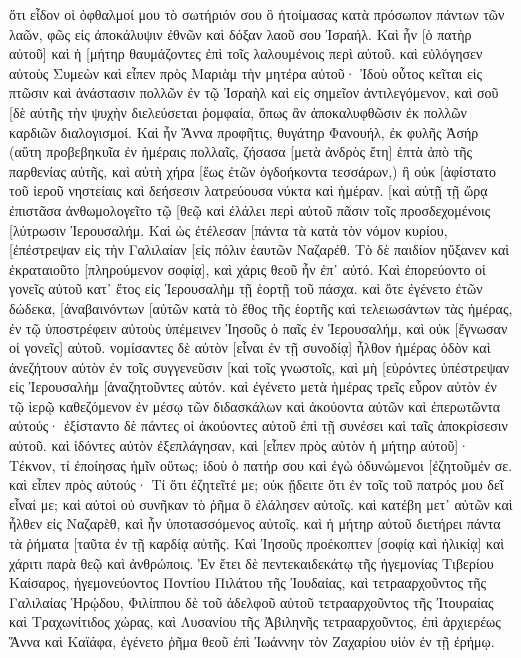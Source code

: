 ὅτι εἶδον οἱ ὀφθαλμοί μου τὸ σωτήριόν σου 
ὃ ἡτοίμασας κατὰ πρόσωπον πάντων τῶν λαῶν, 
φῶς εἰς ἀποκάλυψιν ἐθνῶν καὶ δόξαν λαοῦ σου Ἰσραήλ. 
Καὶ ἦν [ὁ πατὴρ αὐτοῦ] καὶ ἡ [μήτηρ θαυμάζοντες ἐπὶ τοῖς λαλουμένοις περὶ αὐτοῦ. 
καὶ εὐλόγησεν αὐτοὺς Συμεὼν καὶ εἶπεν πρὸς Μαριὰμ τὴν μητέρα αὐτοῦ· Ἰδοὺ οὗτος κεῖται εἰς πτῶσιν καὶ ἀνάστασιν πολλῶν ἐν τῷ Ἰσραὴλ καὶ εἰς σημεῖον ἀντιλεγόμενον, 
καὶ σοῦ [δὲ αὐτῆς τὴν ψυχὴν διελεύσεται ῥομφαία, ὅπως ἂν ἀποκαλυφθῶσιν ἐκ πολλῶν καρδιῶν διαλογισμοί. 
Καὶ ἦν Ἅννα προφῆτις, θυγάτηρ Φανουήλ, ἐκ φυλῆς Ἀσήρ (αὕτη προβεβηκυῖα ἐν ἡμέραις πολλαῖς, ζήσασα [μετὰ ἀνδρὸς ἔτη] ἑπτὰ ἀπὸ τῆς παρθενίας αὐτῆς, 
καὶ αὐτὴ χήρα [ἕως ἐτῶν ὀγδοήκοντα τεσσάρων,) ἣ οὐκ [ἀφίστατο τοῦ ἱεροῦ νηστείαις καὶ δεήσεσιν λατρεύουσα νύκτα καὶ ἡμέραν. 
[καὶ αὐτῇ τῇ ὥρᾳ ἐπιστᾶσα ἀνθωμολογεῖτο τῷ [θεῷ καὶ ἐλάλει περὶ αὐτοῦ πᾶσιν τοῖς προσδεχομένοις [λύτρωσιν Ἰερουσαλήμ. 
Καὶ ὡς ἐτέλεσαν [πάντα τὰ κατὰ τὸν νόμον κυρίου, [ἐπέστρεψαν εἰς τὴν Γαλιλαίαν [εἰς πόλιν ἑαυτῶν Ναζαρέθ. 
Τὸ δὲ παιδίον ηὔξανεν καὶ ἐκραταιοῦτο [πληρούμενον σοφίᾳ], καὶ χάρις θεοῦ ἦν ἐπ᾽ αὐτό. 
Καὶ ἐπορεύοντο οἱ γονεῖς αὐτοῦ κατ᾽ ἔτος εἰς Ἰερουσαλὴμ τῇ ἑορτῇ τοῦ πάσχα. 
καὶ ὅτε ἐγένετο ἐτῶν δώδεκα, [ἀναβαινόντων [αὐτῶν κατὰ τὸ ἔθος τῆς ἑορτῆς 
καὶ τελειωσάντων τὰς ἡμέρας, ἐν τῷ ὑποστρέφειν αὐτοὺς ὑπέμεινεν Ἰησοῦς ὁ παῖς ἐν Ἰερουσαλήμ, καὶ οὐκ [ἔγνωσαν οἱ γονεῖς] αὐτοῦ. 
νομίσαντες δὲ αὐτὸν [εἶναι ἐν τῇ συνοδίᾳ] ἦλθον ἡμέρας ὁδὸν καὶ ἀνεζήτουν αὐτὸν ἐν τοῖς συγγενεῦσιν [καὶ τοῖς γνωστοῖς, 
καὶ μὴ [εὑρόντες ὑπέστρεψαν εἰς Ἰερουσαλὴμ [ἀναζητοῦντες αὐτόν. 
καὶ ἐγένετο μετὰ ἡμέρας τρεῖς εὗρον αὐτὸν ἐν τῷ ἱερῷ καθεζόμενον ἐν μέσῳ τῶν διδασκάλων καὶ ἀκούοντα αὐτῶν καὶ ἐπερωτῶντα αὐτούς· 
ἐξίσταντο δὲ πάντες οἱ ἀκούοντες αὐτοῦ ἐπὶ τῇ συνέσει καὶ ταῖς ἀποκρίσεσιν αὐτοῦ. 
καὶ ἰδόντες αὐτὸν ἐξεπλάγησαν, καὶ [εἶπεν πρὸς αὐτὸν ἡ μήτηρ αὐτοῦ]· Τέκνον, τί ἐποίησας ἡμῖν οὕτως; ἰδοὺ ὁ πατήρ σου καὶ ἐγὼ ὀδυνώμενοι [ἐζητοῦμέν σε. 
καὶ εἶπεν πρὸς αὐτούς· Τί ὅτι ἐζητεῖτέ με; οὐκ ᾔδειτε ὅτι ἐν τοῖς τοῦ πατρός μου δεῖ εἶναί με; 
καὶ αὐτοὶ οὐ συνῆκαν τὸ ῥῆμα ὃ ἐλάλησεν αὐτοῖς. 
καὶ κατέβη μετ᾽ αὐτῶν καὶ ἦλθεν εἰς Ναζαρὲθ, καὶ ἦν ὑποτασσόμενος αὐτοῖς. καὶ ἡ μήτηρ αὐτοῦ διετήρει πάντα τὰ ῥήματα [ταῦτα ἐν τῇ καρδίᾳ αὐτῆς. 
Καὶ Ἰησοῦς προέκοπτεν [σοφίᾳ καὶ ἡλικίᾳ] καὶ χάριτι παρὰ θεῷ καὶ ἀνθρώποις. 
Ἐν ἔτει δὲ πεντεκαιδεκάτῳ τῆς ἡγεμονίας Τιβερίου Καίσαρος, ἡγεμονεύοντος Ποντίου Πιλάτου τῆς Ἰουδαίας, καὶ τετρααρχοῦντος τῆς Γαλιλαίας Ἡρῴδου, Φιλίππου δὲ τοῦ ἀδελφοῦ αὐτοῦ τετρααρχοῦντος τῆς Ἰτουραίας καὶ Τραχωνίτιδος χώρας, καὶ Λυσανίου τῆς Ἀβιληνῆς τετρααρχοῦντος, 
ἐπὶ ἀρχιερέως Ἅννα καὶ Καϊάφα, ἐγένετο ῥῆμα θεοῦ ἐπὶ Ἰωάννην τὸν Ζαχαρίου υἱὸν ἐν τῇ ἐρήμῳ. 
